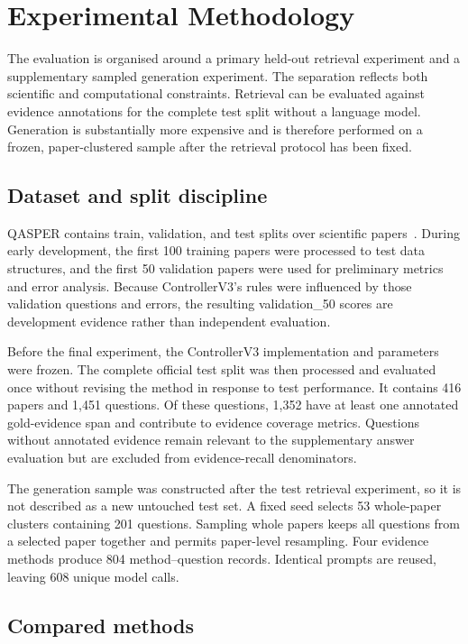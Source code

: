 \chapter{Experimental Methodology}
\label{chap:methodology}

The evaluation is organised around a primary held-out retrieval experiment and a supplementary sampled generation experiment. The separation reflects both scientific and computational constraints. Retrieval can be evaluated against evidence annotations for the complete test split without a language model. Generation is substantially more expensive and is therefore performed on a frozen, paper-clustered sample after the retrieval protocol has been fixed.

\section{Dataset and split discipline}

QASPER contains train, validation, and test splits over scientific papers~\cite{dasigi2021qasper}. During early development, the first 100 training papers were processed to test data structures, and the first 50 validation papers were used for preliminary metrics and error analysis. Because ControllerV3's rules were influenced by those validation questions and errors, the resulting validation_50 scores are development evidence rather than independent evaluation.

Before the final experiment, the ControllerV3 implementation and parameters were frozen. The complete official test split was then processed and evaluated once without revising the method in response to test performance. It contains 416 papers and 1,451 questions. Of these questions, 1,352 have at least one annotated gold-evidence span and contribute to evidence coverage metrics. Questions without annotated evidence remain relevant to the supplementary answer evaluation but are excluded from evidence-recall denominators.

The generation sample was constructed after the test retrieval experiment, so it is not described as a new untouched test set. A fixed seed selects 53 whole-paper clusters containing 201 questions. Sampling whole papers keeps all questions from a selected paper together and permits paper-level resampling. Four evidence methods produce 804 method--question records. Identical prompts are reused, leaving 608 unique model calls.

\section{Compared methods}

